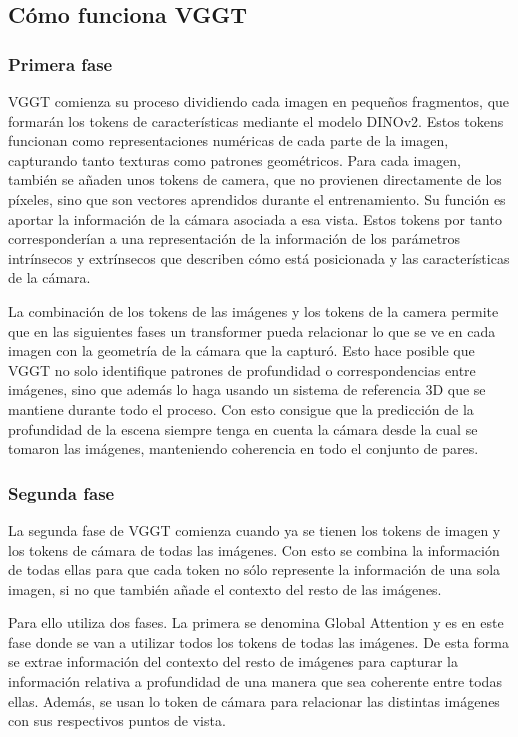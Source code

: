 
\subsection{Cómo funciona VGGT}
\subsubsection{Primera fase}
VGGT comienza su proceso dividiendo cada imagen en pequeños fragmentos, que formarán los tokens de características mediante el modelo DINOv2. Estos tokens funcionan como representaciones numéricas de cada parte de la imagen, capturando tanto texturas como patrones geométricos. Para cada imagen, también se añaden unos tokens de camera, que no provienen directamente de los píxeles, sino que son vectores aprendidos durante el entrenamiento. Su función es aportar la información de la cámara asociada a esa vista. Estos tokens por tanto corresponderían a una representación de la información de los parámetros intrínsecos y extrínsecos que describen cómo está posicionada y las características de la cámara.

La combinación de los tokens de las imágenes y los tokens de la camera permite que en las siguientes fases un transformer pueda relacionar lo que se ve en cada imagen con la geometría de la cámara que la capturó. Esto hace posible que VGGT no solo identifique patrones de profundidad o correspondencias entre imágenes, sino que además lo haga usando un sistema de referencia 3D que se mantiene durante todo el proceso. Con esto consigue que la predicción de la profundidad de la escena siempre tenga en cuenta la cámara desde la cual se tomaron las imágenes, manteniendo coherencia en todo el conjunto de pares.

\subsubsection{Segunda fase}
La segunda fase de VGGT comienza cuando ya se tienen los tokens de imagen y los tokens de cámara de todas las imágenes. Con esto se combina la información de todas ellas para que cada token no sólo represente la información de una sola imagen, si no que también añade el contexto del resto de las imágenes.

Para ello utiliza dos fases. La primera se denomina Global Attention y es en este fase donde se van a utilizar todos los tokens de todas las imágenes. De esta forma se extrae información del contexto del resto de imágenes para capturar la información relativa a profundidad de una manera que sea coherente entre todas ellas. Además, se usan lo token de cámara para relacionar las distintas imágenes con sus respectivos puntos de vista.

